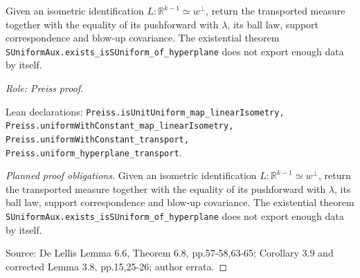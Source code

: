 \begin{lemma}
\label{lem:hyperplane-transport-map}






Given an isometric identification $L:\mathbb R^{k-1}\simeq w^\perp$, return
the transported measure together with the equality of its pushforward with
$\lambda$, its ball law, support correspondence and blow-up covariance.
The existential theorem
\texttt{SUniformAux.exists\_isSUniform\_of\_hyperplane}
does not export enough data by itself.
\par\emph{Role: Preiss proof.}
\par Lean declarations: \texttt{Preiss.isUnitUniform\_map\_linearIsometry, Preiss.uniformWithConstant\_map\_linearIsometry, Preiss.uniformWithConstant\_transport, Preiss.uniform\_hyperplane\_transport}.
\end{lemma}
\begin{proof}[Planned proof obligations]

Given an isometric identification $L:\mathbb R^{k-1}\simeq w^\perp$, return
the transported measure together with the equality of its pushforward with
$\lambda$, its ball law, support correspondence and blow-up covariance.
The existential theorem
\texttt{SUniformAux.exists\_isSUniform\_of\_hyperplane}
does not export enough data by itself.
\par Source: De Lellis Lemma 6.6, Theorem 6.8, pp.57-58,63-65; Corollary 3.9 and corrected Lemma 3.8, pp.15,25-26; author errata.
\end{proof}

